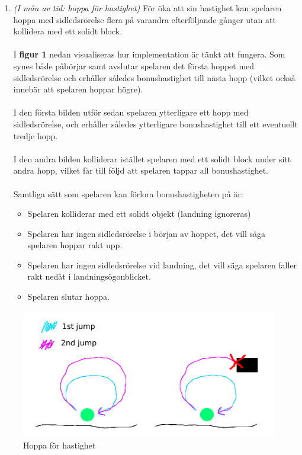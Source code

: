 \documentclass{TDP003mall}
\begin{document}
\begin{enumerate}
\item \noindent\textit{(I mån av tid: hoppa för hastighet)} För öka att sin hastighet kan spelaren hoppa med sidledsrörelse flera på varandra efterföljande gånger utan att kollidera med ett solidt block.
\\\\
I \textbf{figur 1} nedan visualiseras hur implementation är tänkt att fungera. Som synes både påbörjar samt avslutar spelaren det första hoppet med sidledsrörelse och erhåller således bonushastighet till nästa hopp (vilket också innebär att spelaren hoppar högre).
\\\\
I den första bilden utför sedan spelaren ytterligare ett hopp med sidledsrörelse, och erhåller således ytterligare bonushastighet till ett eventuellt tredje hopp. 
\\\\
I den andra bilden kolliderar istället spelaren med ett solidt block under sitt andra hopp, vilket får till följd att spelaren tappar all bonushastighet.
\\\\
Samtliga sätt som spelaren kan förlora bonushastigheten på är:
\begin{itemize}
\item Spelaren kolliderar med ett solidt objekt (landning ignoreras)
\item Spelaren har ingen sidledsrörelse i början av hoppet, det vill säga spelaren hoppar rakt upp.
\item Spelaren har ingen sidledsrörelse vid landning, det vill säga spelaren faller rakt nedåt i landningsögonblicket.
\item Spelaren slutar hoppa.
\end{itemize}
\end{enumerate}

\begin{figure}[!h]
  \centering
  \includegraphics[scale=0.5]{speed_jump}
  \caption{Hoppa för hastighet}
  \label{Meny}
\end{figure}
\end{document}
